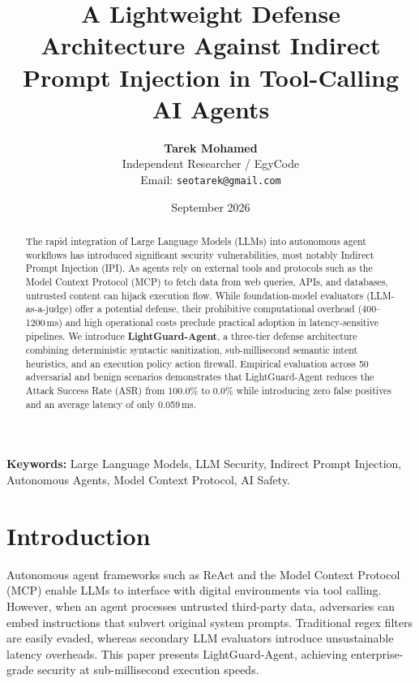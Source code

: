 \documentclass[10pt,twocolumn]{article}
\title{\textbf{A Lightweight Defense Architecture Against Indirect Prompt Injection in Tool-Calling AI Agents}}
\author{
  \textbf{Tarek Mohamed} \\
  Independent Researcher / EgyCode \\
  Email: \texttt{seotarek@gmail.com}
}
\date{September 2026}
\begin{document}
\maketitle

\begin{abstract}
The rapid integration of Large Language Models (LLMs) into autonomous agent workflows has introduced significant security vulnerabilities, most notably Indirect Prompt Injection (IPI). As agents rely on external tools and protocols such as the Model Context Protocol (MCP) to fetch data from web queries, APIs, and databases, untrusted content can hijack execution flow. While foundation-model evaluators (LLM-as-a-judge) offer a potential defense, their prohibitive computational overhead (400--1200\,ms) and high operational costs preclude practical adoption in latency-sensitive pipelines. We introduce \textbf{LightGuard-Agent}, a three-tier defense architecture combining deterministic syntactic sanitization, sub-millisecond semantic intent heuristics, and an execution policy action firewall. Empirical evaluation across 50 adversarial and benign scenarios demonstrates that LightGuard-Agent reduces the Attack Success Rate (ASR) from 100.0\% to 0.0\% while introducing zero false positives and an average latency of only 0.059\,ms.
\end{abstract}

\noindent\textbf{Keywords:} Large Language Models, LLM Security, Indirect Prompt Injection, Autonomous Agents, Model Context Protocol, AI Safety.

\section{Introduction}
Autonomous agent frameworks such as ReAct and the Model Context Protocol (MCP) enable LLMs to interface with digital environments via tool calling. However, when an agent processes untrusted third-party data, adversaries can embed instructions that subvert original system prompts. Traditional regex filters are easily evaded, whereas secondary LLM evaluators introduce unsustainable latency overheads. This paper presents LightGuard-Agent, achieving enterprise-grade security at sub-millisecond execution speeds.
\end{document}
